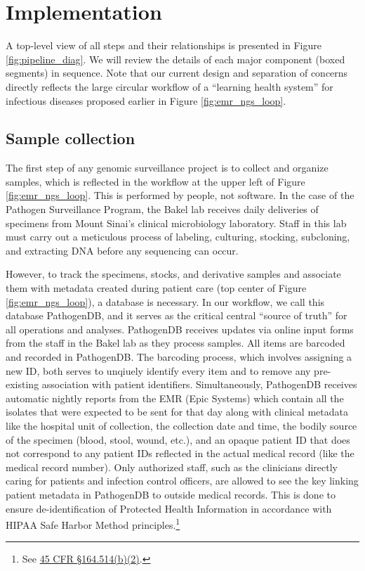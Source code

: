 \section{Implementation}

A top-level view of all steps and their relationships is presented in Figure \ref{fig:pipeline_diag}. We will review the details of each major component (boxed segments) in sequence. Note that our current design and separation of concerns directly reflects the large circular workflow of a ``learning health system'' for infectious diseases proposed earlier in Figure \ref{fig:emr_ngs_loop}.

\subsection{Sample collection}

The first step of any genomic surveillance project is to collect and organize samples, which is reflected in the workflow at the upper left of Figure \ref{fig:emr_ngs_loop}. This is performed by people, not software. In the case of the Pathogen Surveillance Program, the Bakel lab receives daily deliveries of specimens from Mount Sinai's clinical microbiology laboratory. Staff in this lab must carry out a meticulous process of labeling, culturing, stocking, subcloning, and extracting DNA before any sequencing can occur.

However, to track the specimens, stocks, and derivative samples and associate them with metadata created during patient care (top center of Figure \ref{fig:emr_ngs_loop}), a database is necessary. In our workflow, we call this database PathogenDB, and it serves as the critical central ``source of truth'' for all operations and analyses. PathogenDB receives updates via online input forms from the staff in the Bakel lab as they process samples. All items are barcoded and recorded in PathogenDB. The barcoding process, which involves assigning a new ID, both serves to unqiuely identify every item and to remove any pre-existing association with patient identifiers. Simultaneously, PathogenDB receives automatic nightly reports from the EMR (Epic Systems) which contain all the isolates that were expected to be sent for that day along with clinical metadata like the hospital unit of collection, the collection date and time, the bodily source of the specimen (blood, stool, wound, etc.), and an opaque patient ID that does not correspond to any patient IDs reflected in the actual medical record (like the medical record number). Only authorized staff, such as the clinicians directly caring for patients and infection control officers, are allowed to see the key linking patient metadata in PathogenDB to outside medical records. This is done to ensure de-identification of Protected Health Information in accordance with HIPAA Safe Harbor Method principles.\footnote{See \href{https://www.law.cornell.edu/cfr/text/45/164.514}{45 CFR §164.514(b)(2)}.}

